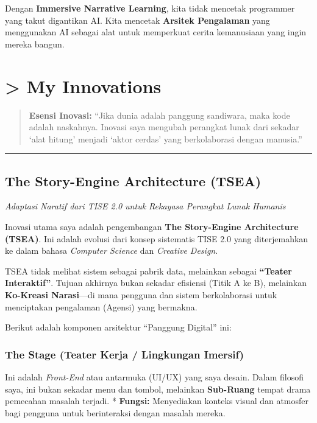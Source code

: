 \documentclass[
  letterpaper,
  DIV=11,
  numbers=noendperiod]{scrreprt}
\begin{document}
Dengan \textbf{Immersive Narrative Learning}, kita tidak mencetak
programmer yang takut digantikan AI. Kita mencetak \textbf{Arsitek
Pengalaman} yang menggunakan AI sebagai alat untuk memperkuat cerita
kemanusiaan yang ingin mereka bangun.


\chapter{\textgreater{} My Innovations}\label{my-innovations}

\begin{quote}
\textbf{Esensi Inovasi:} ``Jika dunia adalah panggung sandiwara, maka
kode adalah naskahnya. Inovasi saya mengubah perangkat lunak dari
sekadar `alat hitung' menjadi `aktor cerdas' yang berkolaborasi dengan
manusia.''
\end{quote}

\begin{center}\rule{0.5\linewidth}{0.5pt}\end{center}

\section{The Story-Engine Architecture
(TSEA)}\label{the-story-engine-architecture-tsea}

\emph{Adaptasi Naratif dari TISE 2.0 untuk Rekayasa Perangkat Lunak
Humanis}

Inovasi utama saya adalah pengembangan \textbf{The Story-Engine
Architecture (TSEA)}. Ini adalah evolusi dari konsep sistematis TISE 2.0
yang diterjemahkan ke dalam bahasa \emph{Computer Science} dan
\emph{Creative Design}.

TSEA tidak melihat sistem sebagai pabrik data, melainkan sebagai
\textbf{``Teater Interaktif''}. Tujuan akhirnya bukan sekadar efisiensi
(Titik A ke B), melainkan \textbf{Ko-Kreasi Narasi}---di mana pengguna
dan sistem berkolaborasi untuk menciptakan pengalaman (Agensi) yang
bermakna.

Berikut adalah komponen arsitektur ``Panggung Digital'' ini:

\subsection{The Stage (Teater Kerja / Lingkungan
Imersif)}\label{the-stage-teater-kerja-lingkungan-imersif}

Ini adalah \emph{Front-End} atau antarmuka (UI/UX) yang saya desain.
Dalam filosofi saya, ini bukan sekadar menu dan tombol, melainkan
\textbf{Sub-Ruang} tempat drama pemecahan masalah terjadi. *
\textbf{Fungsi:} Menyediakan konteks visual dan atmosfer bagi pengguna
untuk berinteraksi dengan masalah mereka.
\end{document}

